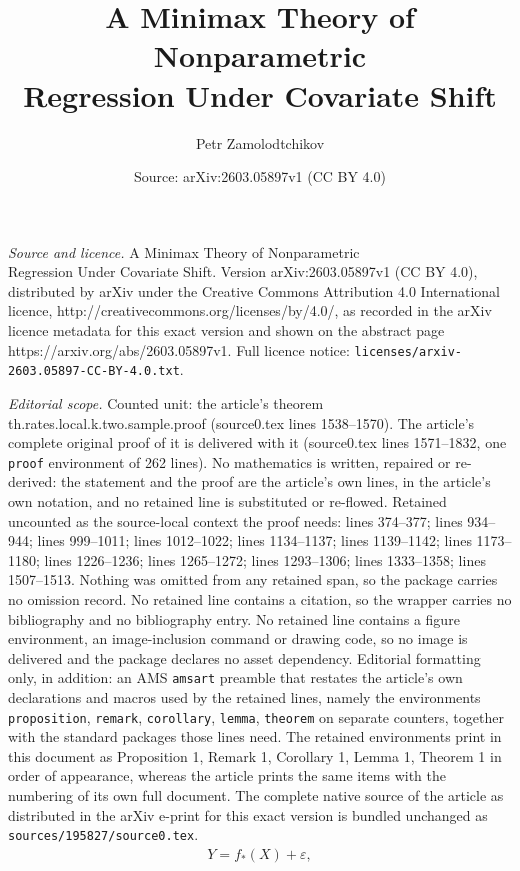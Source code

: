 \documentclass[10pt,a4paper]{amsart}
\title{A Minimax Theory of Nonparametric \\Regression Under Covariate Shift}
\author{Petr Zamolodtchikov}
\date{Source: arXiv:2603.05897v1 (CC BY 4.0)}
\newcommand{\eps}{\varepsilon}
\begin{document}
\maketitle

\noindent\emph{Source and licence.} A Minimax Theory of Nonparametric \\Regression Under Covariate Shift. Version arXiv:2603.05897v1 (CC BY 4.0), distributed by arXiv under the Creative Commons Attribution 4.0 International licence, http://creativecommons.org/licenses/by/4.0/, as recorded in the arXiv licence metadata for this exact version and shown on the abstract page https://arxiv.org/abs/2603.05897v1. Full licence notice: \texttt{licenses/arxiv-2603.05897-CC-BY-4.0.txt}.\par\smallskip

\noindent\textit{Editorial scope.} Counted unit: the article's theorem th.rates.local.k.two.sample.proof (source0.tex lines 1538--1570). The article's complete original proof of it is delivered with it (source0.tex lines 1571--1832, one \texttt{proof} environment of 262 lines). No mathematics is written, repaired or re-derived: the statement and the proof are the article's own lines, in the article's own notation, and no retained line is substituted or re-flowed.  Retained uncounted as the source-local context the proof needs: lines 374--377; lines 934--944; lines 999--1011; lines 1012--1022; lines 1134--1137; lines 1139--1142; lines 1173--1180; lines 1226--1236; lines 1265--1272; lines 1293--1306; lines 1333--1358; lines 1507--1513.  Nothing was omitted from any retained span, so the package carries no omission record.  No retained line contains a citation, so the wrapper carries no bibliography and no bibliography entry.  No retained line contains a figure environment, an image-inclusion command or drawing code, so no image is delivered and the package declares no asset dependency.  Editorial formatting only, in addition: an AMS \texttt{amsart} preamble that restates the article's own declarations and macros used by the retained lines, namely the environments \texttt{proposition}, \texttt{remark}, \texttt{corollary}, \texttt{lemma}, \texttt{theorem} on separate counters, together with the standard packages those lines need.  The retained environments print in this document as Proposition 1, Remark 1, Corollary 1, Lemma 1, Theorem 1 in order of appearance, whereas the article prints the same items with the numbering of its own full document.  The complete native source of the article as distributed in the arXiv e-print for this exact version is bundled unchanged as \texttt{sources/195827/source0.tex}.
\begin{align}
    \label{eq.model}
    Y = f_*(X) + \eps,
\end{align}
\end{document}

